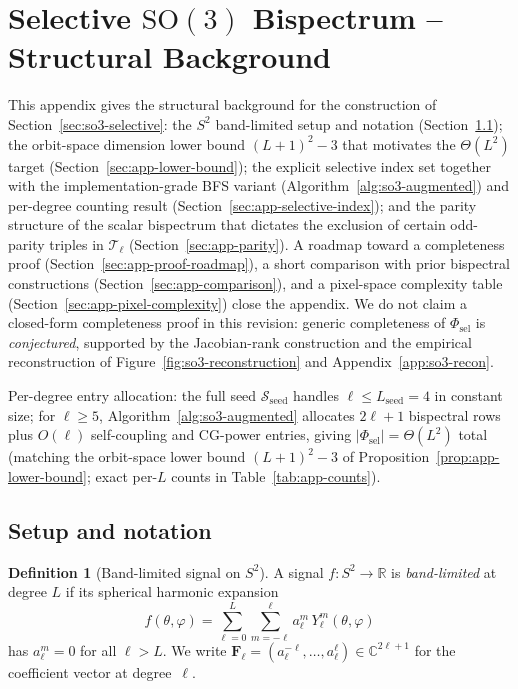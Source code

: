 \documentclass{article}
\theoremstyle{definition}
\newtheorem{definition}[theorem]{Definition}
\theoremstyle{remark}
\newcommand{\R}{\mathbb{R}}
\newcommand{\C}{\mathbb{C}}
\newcommand{\SO}{\mathrm{SO}}
\newcommand{\SH}{Y}
\theoremstyle{definition}
\begin{document}
\appendix

\section{Selective $\SO(3)$ Bispectrum -- Structural Background}
\label{app:so3-proof}

This appendix gives the structural background for the construction
of Section~\ref{sec:so3-selective}: the $S^2$ band-limited setup and
notation (Section~\ref{sec:app-setup}); the orbit-space dimension
lower bound $(L{+}1)^2-3$ that motivates the $\Theta(L^2)$ target
(Section~\ref{sec:app-lower-bound}); the explicit selective index set
together with the implementation-grade BFS variant
(Algorithm~\ref{alg:so3-augmented}) and per-degree counting result
(Section~\ref{sec:app-selective-index}); and the parity structure of
the scalar bispectrum that dictates the exclusion of certain
odd-parity triples in $\mathcal{T}_\ell$
(Section~\ref{sec:app-parity}). A roadmap toward a completeness proof
(Section~\ref{sec:app-proof-roadmap}), a short comparison with prior bispectral
constructions (Section~\ref{sec:app-comparison}), and a pixel-space
complexity table (Section~\ref{sec:app-pixel-complexity}) close the
appendix. We do not claim a closed-form completeness proof in this
revision: generic completeness of $\Phi_{\mathrm{sel}}$ is
\emph{conjectured}, supported by the Jacobian-rank construction and
the empirical reconstruction of
Figure~\ref{fig:so3-reconstruction} and Appendix~\ref{app:so3-recon}.

Per-degree entry allocation: the full seed
$\mathcal{S}_{\mathrm{seed}}$ handles $\ell\le L_{\mathrm{seed}}=4$
in constant size; for $\ell\ge 5$, Algorithm~\ref{alg:so3-augmented}
allocates $2\ell{+}1$ bispectral rows plus $O(\ell)$
self-coupling and CG-power entries, giving
$|\Phi_{\mathrm{sel}}|=\Theta(L^2)$ total (matching the orbit-space
lower bound $(L{+}1)^2-3$ of
Proposition~\ref{prop:app-lower-bound}; exact per-$L$ counts in
Table~\ref{tab:app-counts}).

\subsection{Setup and notation}
\label{sec:app-setup}

\begin{definition}[Band-limited signal on $S^2$]
A signal $f : S^2 \to \R$ is \emph{band-limited} at degree $L$ if its
spherical harmonic expansion
\begin{equation}\label{eq:app-sh-expansion}
  f(\theta, \varphi)
  = \sum_{\ell=0}^{L} \sum_{m=-\ell}^{\ell}
    a_\ell^m \, \SH_\ell^m(\theta, \varphi)
\end{equation}
has $a_\ell^m = 0$ for all $\ell > L$. We write
$\mathbf{F}_\ell = (a_\ell^{-\ell}, \dotsc, a_\ell^{\ell})
  \in \C^{2\ell+1}$
for the coefficient vector at degree~$\ell$.
\end{definition}
\end{document}
